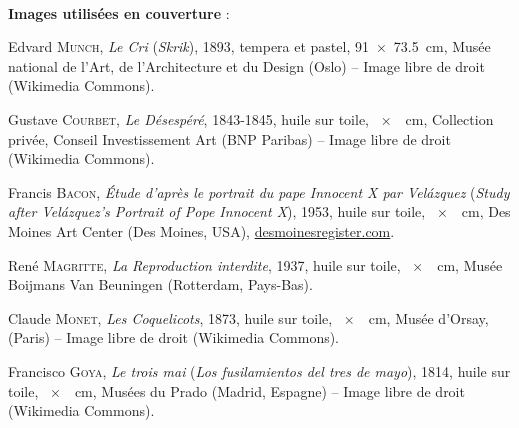 \pagestyle{plain}
\renewcommand{\headrulewidth}{0.0pt}
~

\vfill
\textbf{Images utilisées en couverture} :\vspace{6pt}

\setlength{\parskip}{3pt}
Edvard \textsc{Munch}, \textit{Le Cri} (\textit{Skrik}), 1893, tempera et pastel, 91~×~73.5~cm,  Musée national de l'Art, de l'Architecture et du Design (Oslo)  -- Image libre de droit (Wikimedia Commons).

Gustave \textsc{Courbet}, \textit{Le Désespéré}, 1843-1845, huile sur toile, ~×~~cm, Collection privée, Conseil Investissement Art (BNP Paribas)  -- Image libre de droit (Wikimedia Commons).

Francis \textsc{Bacon}, \textit{Étude d'après le portrait du pape Innocent X par Velázquez} (\textit{Study after Velázquez's Portrait of Pope Innocent X}), 1953, huile sur toile, ~×~~cm,  	
Des Moines Art Center (Des Moines, USA), \href{desmoinesregister.com}{desmoinesregister.com}.

René \textsc{Magritte}, \textit{La Reproduction interdite}, 1937, huile sur toile, ~×~~cm, Musée Boijmans Van Beuningen (Rotterdam, Pays-Bas).

Claude \textsc{Monet}, \textit{Les Coquelicots}, 1873, huile sur toile, ~×~~cm, Musée d'Orsay, (Paris) -- Image libre de droit (Wikimedia Commons).

Francisco \textsc{Goya}, \textit{Le trois mai} (\textit{Los fusilamientos del tres de mayo}), 1814, huile sur toile, ~×~~cm, Musées du Prado (Madrid, Espagne)  -- Image libre de droit (Wikimedia Commons).

\vspace*{12pt}

\doclicenseIcon \doclicenseLongText
\setlength{\parskip}{6pt}